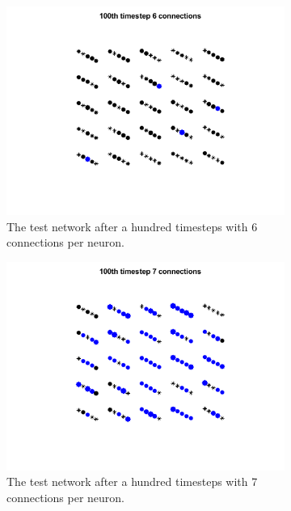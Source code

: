 \begin{figure}
    \centering
    \begin{subfigure}[b]{0.225\textwidth}
        \includegraphics[width=\textwidth]{Images/pool_6_100.png}
        \caption{The test network after a hundred timesteps with 6 connections per neuron.}
    \label{fig:reservoir_6}
    \end{subfigure}
    \begin{subfigure}[b]{0.225\textwidth}
        \includegraphics[width=\textwidth]{Images/pool_7_100.png}
        \caption{The test network after a hundred timesteps with 7 connections per neuron.}
    \label{fig:reservoir_7}
    \end{subfigure}
    \begin{subfigure}[b]{0.225\textwidth}

\end{subfigure}
\end{figure}
